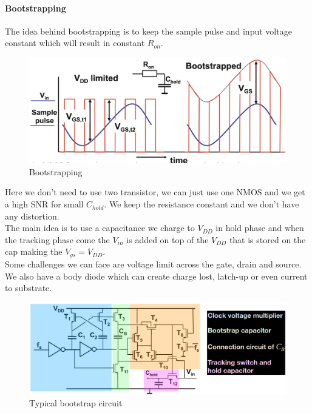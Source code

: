 \documentclass[
  a4paper,
]{article}
\begin{document}
\hypertarget{bootstrapping}{%
\paragraph{Bootstrapping}\label{bootstrapping}}

The idea behind bootstrapping is to keep the sample pulse and input
voltage constant which will result in constant \(R_{on}\).

\begin{figure}
\hypertarget{fig:enter-label}{%
\centering
\includegraphics{img/bootstrapping.png}
\caption{Bootstrapping}\label{fig:enter-label}
}
\end{figure}

Here we don't need to use two transistor, we can just use one NMOS and
we get a high SNR for small \(C_{hold}\). We keep the resistance
constant and we don't have any distortion.\\
The main idea is to use a capacitance we charge to \(V_{DD}\) in hold
phase and when the tracking phase come the \(V_{in}\) is added on top of
the \(V_{DD}\) that is stored on the cap making the
\(V_{gs} = V_{DD}\).\\
Some challenges we can face are voltage limit across the gate, drain and
source. We also have a body diode which can create charge lost, latch-up
or even current to substrate.

\begin{figure}
\hypertarget{fig:enter-label}{%
\centering
\includegraphics{img/typical_bootstrap.png}
\caption{Typical bootstrap circuit}\label{fig:enter-label}
}
\end{figure}
\end{document}
